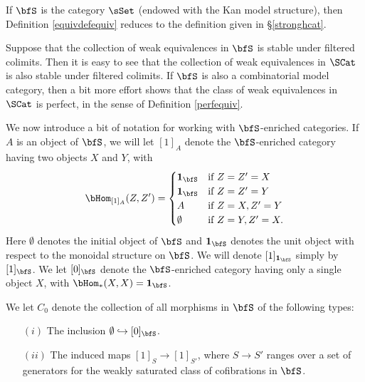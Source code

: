 \begin{remark}
If $\bfS$ is the category $\sSet$ (endowed with the Kan model structure), then Definition \ref{equivdefequiv} reduces to the definition given in \S \ref{stronghcat}.
\end{remark}

\begin{remark}\label{swunk}
Suppose that the collection of  weak equivalences in $\bfS$ is stable under filtered colimits.
Then it is easy to see that the collection of weak equivalences in $\SCat$ is also stable under filtered colimits. If $\bfS$ is also a combinatorial model category, then a bit more effort shows that
the class of weak equivalences in $\SCat$ is perfect, in the sense of Definition \ref{perfequiv}.
\end{remark}

We now introduce a bit of notation for working with $\bfS$-enriched categories. If $A$ is an object of $\bfS$, we will let $[1]_{A}$ denote the $\bfS$-enriched category having two objects $X$ and $Y$, with
$$ \bHom_{[1]_{A}}(Z,Z') = \begin{cases} {\bf 1}_{\bfS} & \text{if } Z=Z'=X \\
{\bf 1}_{\bfS} & \text{if } Z=Z'=Y \\
A & \text{if } Z=X, Z'=Y \\
\emptyset & \text{if } Z=Y, Z'=X.\end{cases}$$
Here $\emptyset$ denotes the initial object of $\bfS$ and ${\bf 1}_{\bfS}$ denotes the
unit object with respect to the monoidal structure on $\bfS$. We will denote
$[1]_{ {\bf 1}_{\bfS} }$ simply by $[1]_{\bfS}$. 
We let $[0]_{\bfS}$ denote the $\bfS$-enriched category having only a single object $X$, with $\bHom_{\ast}(X,X)={\bf 1}_{\bfS}$.

We let $C_0$ denote the collection of all morphisms in $\bfS$ of the following types:
\begin{itemize}
\item[$(i)$] The inclusion $\emptyset \hookrightarrow [0]_{\bfS}$.
\item[$(ii)$] The induced maps $[1]_{S} \rightarrow [1]_{S'}$, where
$S \rightarrow S'$ ranges over a set of generators for the weakly saturated class of
cofibrations in $\bfS$.
\end{itemize}

